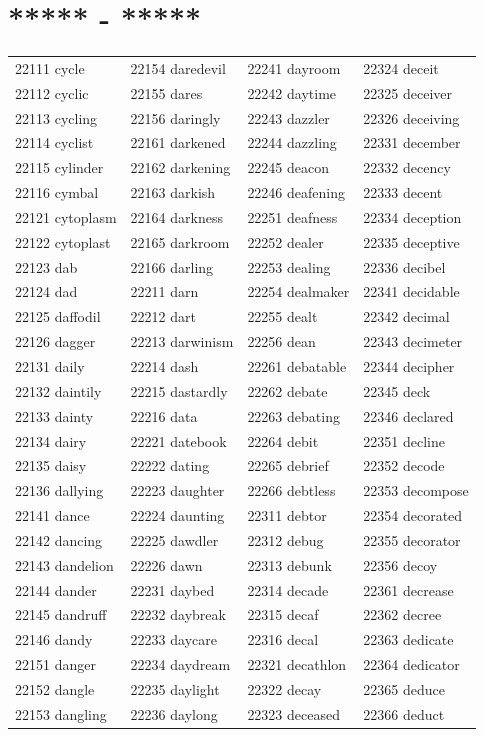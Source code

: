 \documentclass[10pt, oneside]{book}
\begin{document}
\begin{table}
	\centering
	\section*{***** - *****}
	\begin{tabular}{l l l l}
22111 cycle &22154 daredevil &22241 dayroom &22324 deceit\\
22112 cyclic &22155 dares &22242 daytime &22325 deceiver\\
22113 cycling &22156 daringly &22243 dazzler &22326 deceiving\\
22114 cyclist &22161 darkened &22244 dazzling &22331 december\\
22115 cylinder &22162 darkening &22245 deacon &22332 decency\\
22116 cymbal &22163 darkish &22246 deafening &22333 decent\\
22121 cytoplasm &22164 darkness &22251 deafness &22334 deception\\
22122 cytoplast &22165 darkroom &22252 dealer &22335 deceptive\\
22123 dab &22166 darling &22253 dealing &22336 decibel\\
22124 dad &22211 darn &22254 dealmaker &22341 decidable\\
22125 daffodil &22212 dart &22255 dealt &22342 decimal\\
22126 dagger &22213 darwinism &22256 dean &22343 decimeter\\
22131 daily &22214 dash &22261 debatable &22344 decipher\\
22132 daintily &22215 dastardly &22262 debate &22345 deck\\
22133 dainty &22216 data &22263 debating &22346 declared\\
22134 dairy &22221 datebook &22264 debit &22351 decline\\
22135 daisy &22222 dating &22265 debrief &22352 decode\\
22136 dallying &22223 daughter &22266 debtless &22353 decompose\\
22141 dance &22224 daunting &22311 debtor &22354 decorated\\
22142 dancing &22225 dawdler &22312 debug &22355 decorator\\
22143 dandelion &22226 dawn &22313 debunk &22356 decoy\\
22144 dander &22231 daybed &22314 decade &22361 decrease\\
22145 dandruff &22232 daybreak &22315 decaf &22362 decree\\
22146 dandy &22233 daycare &22316 decal &22363 dedicate\\
22151 danger &22234 daydream &22321 decathlon &22364 dedicator\\
22152 dangle &22235 daylight &22322 decay &22365 deduce\\
22153 dangling &22236 daylong &22323 deceased &22366 deduct\\
	\end{tabular}
 \end{table}
\end{document}
